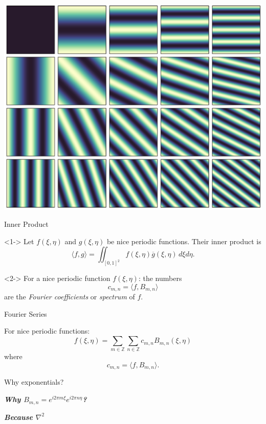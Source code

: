 \documentclass[xetex, onlymath, aspectratio=169]{beamer}
\begin{document}
\begin{frame} \centering
	\includegraphics[height=.9\paperheight]{figures/flat-basis-functions}
\end{frame}

\begin{frame}{Inner Product}
	\begin{definition}<1->
		Let \(f(\xi, \eta)\) and \(g(\xi, \eta)\) be nice periodic functions. Their inner product is
		\[
			\langle f, g \rangle = \iint_{[0, 1]^2} f(\xi, \eta) \overline{g}(\xi, \eta) \, d\xi d\eta.
		\]
	\end{definition}

	\begin{definition}<2->
		For a nice periodic function \(f(\xi, \eta)\): the numbers
		\[
			c_{m, n} = \langle f, B_{m, n} \rangle
		\]
		are the \emph{Fourier coefficients} or \emph{spectrum} of \(f\). 
	\end{definition}
\end{frame}

\begin{frame}{Fourier Series}
	\begin{theorem}
		For nice periodic functions:
  	\[
  		f(\xi, \eta) = \sum_{m \in \mathbb{Z}} \sum_{n \in \mathbb{Z}}
				c_{m, n} B_{m, n} (\xi, \eta)
  	\]
		where
		\[
			c_{m, n} = \langle f, B_{m, n} \rangle.
		\]
	\end{theorem}
\end{frame}

\begin{frame}{Why exponentials?}
	
	\centering

	{\huge\bfseries\itshape Why \(B_{m, n} = e^{i2\pi m\xi} e^{i2\pi n\eta}\)?}
	\vspace{3em}
	
	{\huge\bfseries\itshape Because
		{\Huge \(\nabla^2\)}
	}
	
\end{frame}
\end{document}

